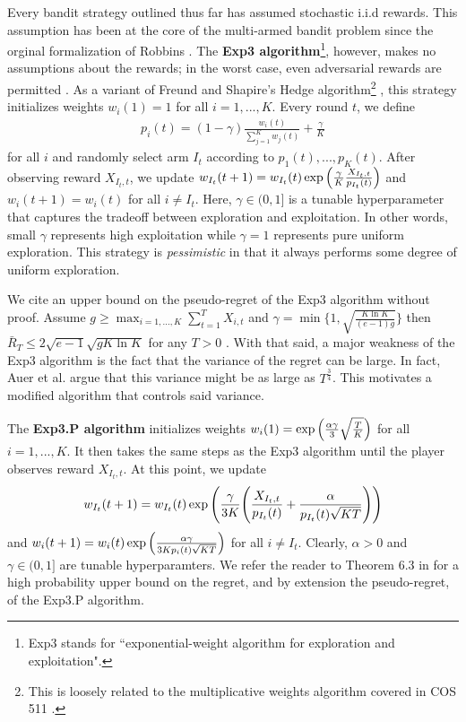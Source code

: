 \documentclass[12pt]{article}
\begin{document}
Every bandit strategy outlined thus far has assumed stochastic i.i.d rewards. This assumption has been at the core of the multi-armed bandit problem since the orginal formalization of Robbins \cite{robbins1952}. The \textbf{Exp3 algorithm}\footnote{Exp3 stands for ``exponential-weight algorithm for exploration and exploitation".}, however, makes no assumptions about the rewards; in the worst case, even adversarial rewards are permitted \cite{auer2003}. As a variant of Freund and Shapire's Hedge algorithm\footnote{This is loosely related to the multiplicative weights algorithm covered in COS 511 \cite{lecture16}.} \cite{freund1997}, this strategy initializes weights $w_{i}(1)=1$ for all $i=1,...,K$. Every round $t$, we define
\begin{align}
p_{i}(t)=(1-\gamma)\frac{w_{i}(t)}{\sum_{j=1}^{K}w_{j}(t)}+\frac{\gamma}{K}
\end{align}
for all $i$ and randomly select arm $I_{t}$ according to $p_{1}(t),...,p_{K}(t)$. After observing reward $X_{I_{t},t}$, we update $w_{I_{t}}(t+1)=w_{I_{t}}(t)\exp\Big{(}{\frac{\gamma}{K}\frac{X_{I_{t},t}}{p_{I_{t}}(t)}}\Big{)}$ and $w_{i}(t+1)=w_{i}(t)$ for all $i\neq I_{t}$. Here, $\gamma\in(0,1]$ is a tunable hyperparameter that captures the tradeoff between exploration and exploitation. In other words, small $\gamma$ represents high exploitation while $\gamma=1$ represents pure uniform exploration. This strategy is \textit{pessimistic} in that it always performs some degree of uniform exploration.

We cite an upper bound on the pseudo-regret of the Exp3 algorithm without proof. Assume $g\geq\max_{i=1,...,K}\sum_{t=1}^{T}X_{i,t}$ and $\gamma=\min\{1,\sqrt{\frac{K\ln K}{(e-1)g}}\}$ then $\bar{R}_{T}\leq 2\sqrt{e-1}\sqrt{gK\ln K}$ for any $T>0$ \cite{auer2003}. With that said, a major weakness of the Exp3 algorithm is the fact that the variance of the regret can be large. In fact, Auer et al. argue that this variance might be as large as $T^{\frac{3}{4}}$. This motivates a modified algorithm that controls said variance.

The \textbf{Exp3.P algorithm} initializes weights $w_{i}(1)=\exp\Big{(}\frac{\alpha\gamma}{3}\sqrt{\frac{T}{K}}\Big{)}$ for all $i=1,...,K$. It then takes the same steps as the Exp3 algorithm until the player observes reward $X_{I_{t},t}$. At this point, we update
\begin{align}
w_{I_{t}}(t+1)=w_{I_{t}}(t)\exp\Bigg{(}\frac{\gamma}{3K}\Bigg{(}\frac{X_{I_{t},t}}{p_{I_{t}}(t)}+\frac{\alpha}{p_{I_{t}}(t)\sqrt{KT}}\Bigg{)}\Bigg{)}
\end{align}
and $w_{i}(t+1)=w_{i}(t)\exp\Big{(}\frac{\alpha\gamma}{3K p_{i}(t)\sqrt{KT}}\Big{)}$ for all $i\neq I_{t}$. Clearly, $\alpha>0$ and $\gamma\in(0,1]$ are tunable hyperparamters. We refer the reader to Theorem 6.3 in \cite{auer2003} for a high probability upper bound on the regret, and by extension the pseudo-regret, of the Exp3.P algorithm.
\end{document}
